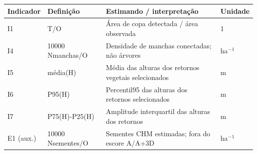 \begin{tabular}{llll}
\hline
Indicador & Definição & Estimando / interpretação & Unidade \\
\hline
I1 & T/O & Área de copa detectada / área observada & 1 \\
I4 & 10000 Nmanchas/O & Densidade de manchas conectadas; não árvores & ha$^{-}$$^{1}$ \\
I5 & média(H) & Média das alturas dos retornos vegetais selecionados & m \\
I6 & P95(H) & Percentil95 das alturas dos retornos selecionados & m \\
I7 & P75(H)-P25(H) & Amplitude interquartil das alturas dos retornos & m \\
E1 (aux.) & 10000 Nsementes/O & Sementes CHM estimadas; fora do escore A/A+3D & ha$^{-}$$^{1}$ \\
\hline
\end{tabular}
